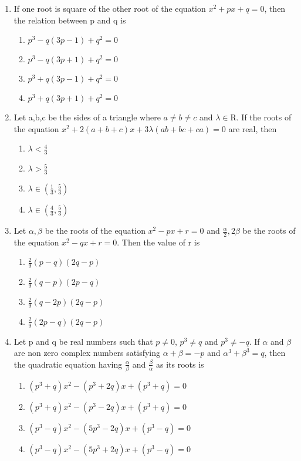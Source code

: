 \documentclass[journal,12pt,twocolumn]{IEEEtran}
\begin{document}
\begin{enumerate}[label=\arabic*]
\item If one root is square of the other root of the equation $x^{2}+px+q=0$, then the relation between p and q is
\begin{enumerate}
\item $p^{3}-q(3p-1)+q^{2}=0$
\item $p^{3}-q(3p+1)+q^{2}=0$
\item $p^{3}+q(3p-1)+q^{2}=0$
\item $p^{3}+q(3p+1)+q^{2}=0$ 
\end{enumerate}

\item Let a,b,c be the sides of a triangle where ${a}\neq{b}\neq{c}$ and $\lambda \in$R. If the roots of the equation $x^{2}+2(a+b+c)x+3\lambda(ab+bc+ca)=0$ are real, then
\begin{enumerate}
\item $\lambda<\frac{4}{3}$
\item $\lambda>\frac{5}{3}$
\item $\lambda\in(\frac{1}{3},\frac{5}{3})$ 
\item $\lambda\in(\frac{4}{3},\frac{5}{3})$
\end{enumerate}

\item Let $\alpha, \beta$ be the roots of the equation $x^{2}-px+r=0$ and $\frac{\alpha}{2},2\beta$ be the roots of the equation $x^{2}-qx+r=0$. Then the value of r is
\begin{enumerate}
\item $\frac{2}{9}(p-q)(2q-p)$
\item $\frac{2}{9}(q-p)(2p-q)$
\item $\frac{2}{9}(q-2p)(2q-p)$
\item $\frac{2}{9}(2p-q)(2q-p)$ 
\end{enumerate}

\item Let p and q be real numbers such that $p\neq0$, $p^{3}\neq{q}$ and $p^{3}\neq-q$. If $\alpha$ and $\beta$ are non zero complex numbers satisfying $\alpha+\beta=-p$ and $\alpha^{3}+\beta^{3}=q$, then the quadratic equation having $\frac{\alpha}{\beta}$ and $\frac{\beta}{\alpha}$ as its roots is 
\begin{enumerate}
\item $(p^{3}+q)x^{2}-(p^{3}+2q)x+(p^{3}+q)=0$
\item $(p^{3}+q)x^{2}-(p^{3}-2q)x+(p^{3}+q)=0$ 
\item $(p^{3}-q)x^{2}-(5p^{3}-2q)x+(p^{3}-q)=0$
\item $(p^{3}-q)x^{2}-(5p^{3}+2q)x+(p^{3}-q)=0$ 
\end{enumerate}


\end{enumerate}
\end{document}
